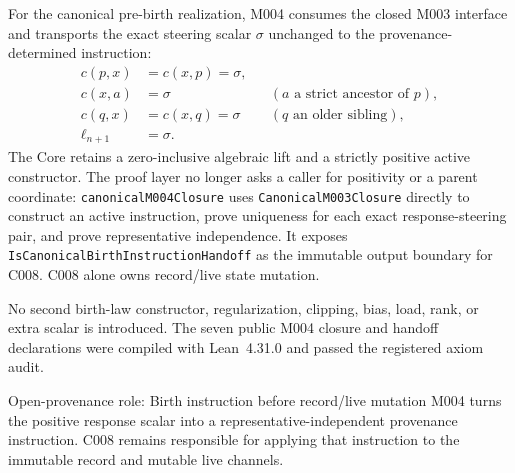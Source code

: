 For the canonical pre-birth realization, M004 consumes the closed M003
interface and transports the exact steering scalar $\sigma$ unchanged to the
provenance-determined instruction:
\[
\begin{aligned}
 c(p,x)&=c(x,p)=\sigma,\\
 c(x,a)&=\sigma &&(a\text{ a strict ancestor of }p),\\
 c(q,x)&=c(x,q)=\sigma &&(q\text{ an older sibling}),\\
 \ell_{n+1}&=\sigma.
\end{aligned}
\]
The Core retains a zero-inclusive algebraic lift and a strictly positive active
constructor.  The proof layer no longer asks a caller for positivity or a
parent coordinate: \texttt{canonicalM004Closure} uses
\texttt{CanonicalM003Closure} directly to construct an active instruction,
prove uniqueness for each exact response-steering pair, and prove
representative independence.  It exposes
\texttt{IsCanonicalBirthInstructionHandoff} as the immutable output boundary
for C008.  C008 alone owns record/live state mutation.

No second birth-law constructor, regularization, clipping, bias, load, rank, or
extra scalar is introduced.  The seven public M004 closure and handoff declarations were compiled with Lean~4.31.0 and passed the registered axiom audit.

\begin{cnnaInfoBox}{Open-provenance role: Birth instruction before record/live mutation}
M004 turns the positive response scalar into a representative-independent provenance instruction.  C008 remains responsible for applying that instruction to the immutable record and mutable live channels.
\end{cnnaInfoBox}
